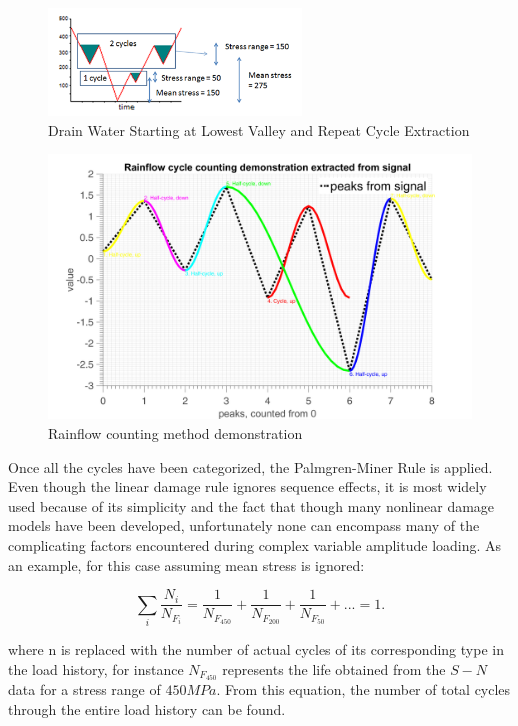 \documentclass[3p,times,procedia,number]{elsarticle}
\begin{document}
\begin{figure}[h!]
	\centering
	\includegraphics[width=0.6\textwidth]{figures//DrainWater.png} 
	\caption{Drain Water Starting at Lowest Valley and Repeat Cycle Extraction}
	\label{DrainWater}
\end{figure}   

\begin{figure}[h!]
	\centering
	\includegraphics[width=\textwidth]{figures//rfdemo.png} 
	\caption{Rainflow counting method demonstration}
	\label{rfdemo}
\end{figure}  

Once all the cycles have been categorized, the Palmgren-Miner Rule is applied. Even though the linear damage rule ignores sequence effects, it is most widely used because of its simplicity and the fact that though many nonlinear damage models have been developed, unfortunately none can encompass many of the complicating factors encountered during complex variable amplitude loading. As an example, for this case assuming mean stress is ignored:

$$\sum_i \frac{N_i}{N_{F_i}}=\frac{1}{N_{F_{450}}}+\frac{1}{N_{F_{200}}}+\frac{1}{N_{F_{50}}}+...=1.$$

where n is replaced with the number of actual cycles of its corresponding type in the load history, for instance $N_{F_{450}}$ represents the life obtained from the $S-N$ data for a stress range of $450MPa$.  From this equation, the number of total cycles through the entire load history can be found.
\end{document}
